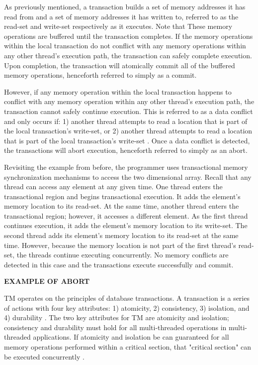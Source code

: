 \documentclass[11pt]{book}
\begin{document}
As previously mentioned, a transaction builds a set of memory addresses it has read from
and a set of memory addresses it has written to, referred to as the read-set and write-set
respectively \cite{intel_prog_ref} as it executes.  Note that These memory operations are
buffered until the transaction completes.  If the memory operations within the local
transaction do not conflict with any memory operations within any other thread's execution
path, the transaction can safely complete execution.  Upon completion, the transaction
will atomically commit all of the buffered memory operations, henceforth referred to
simply as a commit.

However, if any memory operation within the local transaction happens to conflict with any
memory operation within any other thread's execution path, the transaction cannot safely
continue execution.  This is referred to as a data conflict and only occurs if: 1) another
thread attempts to read a location that is part of the local transaction's write-set, or
2) another thread attempts to read a location that is part of the local transaction's
write-set \cite{intel_prog_ref}.  Once a data conflict is detected, the transactions will
abort execution, henceforth referred to simply as an abort.

Revisiting the example from before, the programmer uses transactional memory
synchronization mechanisms to access the two dimensional array.  Recall that any thread
can access any element at any given time.  One thread enters the transactional region and
begins transactional execution.  It adds the element's memory location to its read-set.
At the same time, another thread enters the transactional region; however, it accesses a
different element.  As the first thread continues execution, it adds the element's memory
location to its write-set.  The second thread adds its element's memory location to its
read-set at the same time.  However, because the memory location is not part of the first
thread's read-set, the threads continue executing concurrently.  No memory conflicts are
detected in this case and the transactions execute successfully and commit.

\textbf{EXAMPLE OF ABORT}

TM operates on the principles of database transactions.  A transaction is a series of
actions with four key attributes: 1) atomicity, 2) consistency, 3) isolation, and 4)
durability \cite{tm_2nd}.  The two key attributes for TM are atomicity and isolation;
consistency and durability must hold for all multi-threaded operations in multi-threaded
applications.  If atomicity and isolation be can guaranteed for all memory operations
performed within a critical section, that "critical section" can be executed concurrently
\cite{sle_rajwar}.
\end{document}
